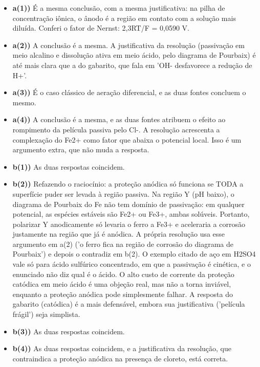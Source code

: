 \documentclass{article}%
\begin{document}
\begin{itemize}%
\item%
\textbf{a(1))} É a mesma conclusão, com a mesma justificativa: na pilha de concentração iônica, o ânodo é a região em contato com a solução mais diluída. Conferi o fator de Nernst: 2,3RT/F = 0,0590 V.%
\item%
\textbf{a(2))} A conclusão é a mesma. A justificativa da resolução (passivação em meio alcalino e dissolução ativa em meio ácido, pelo diagrama de Pourbaix) é até mais clara que a do gabarito, que fala em 'OH- desfavorece a redução de H+'.%
\item%
\textbf{a(3))} É o caso clássico de aeração diferencial, e as duas fontes concluem o mesmo.%
\item%
\textbf{a(4))} A conclusão é a mesma, e as duas fontes atribuem o efeito ao rompimento da película passiva pelo Cl-. A resolução acrescenta a complexação do Fe2+ como fator que abaixa o potencial local. Isso é um argumento extra, que não muda a resposta.%
\item%
\textbf{b(1))} As duas respostas coincidem.%
\item%
\textbf{b(2))} Refazendo o raciocínio: a proteção anódica só funciona se TODA a superfície puder ser levada à região passiva. Na região Y (pH baixo), o diagrama de Pourbaix do Fe não tem domínio de passivação: em qualquer potencial, as espécies estáveis são Fe2+ ou Fe3+, ambas solúveis. Portanto, polarizar Y anodicamente só levaria o ferro a Fe3+ e aceleraria a corrosão justamente na região que já é anódica. A própria resolução usa esse argumento em a(2) ('o ferro fica na região de corrosão do diagrama de Pourbaix') e depois o contradiz em b(2). O exemplo citado de aço em H2SO4 vale só para ácido sulfúrico concentrado, em que a passivação é cinética, e o enunciado não diz qual é o ácido. O alto custo de corrente da proteção catódica em meio ácido é uma objeção real, mas não a torna inviável, enquanto a proteção anódica pode simplesmente falhar. A resposta do gabarito (catódica) é a mais defensável, embora sua justificativa ('película frágil') seja simplista.%
\item%
\textbf{b(3))} As duas respostas coincidem.%
\item%
\textbf{b(4))} As duas respostas coincidem, e a justificativa da resolução, que contraindica a proteção anódica na presença de cloreto, está correta.%
\end{itemize}%
\end{document}
